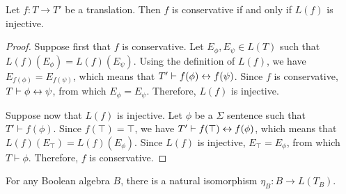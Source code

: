\begin{prop} Let $f:T\to T'$ be a translation. Then $f$ is
  conservative if and only if $L(f)$ is injective. \end{prop}

\begin{proof} Suppose first that $f$ is conservative.  Let $E_\phi
  ,E_\psi\in L(T)$ such that $L(f)(E_\phi )=L(f)(E_\psi )$.  Using the
  definition of $L(f)$, we have $E_{f(\phi )}=E_{f(\psi )}$, which
  means that $T'\vdash f(\phi )\leftrightarrow f(\psi )$.  Since $f$ is
  conservative, $T\vdash \phi\leftrightarrow \psi$, from which $E_\phi=E_\psi$.
  Therefore, $L(f)$ is injective.

  Suppose now that $L(f)$ is injective.  Let $\phi$ be a $\Sigma$
  sentence such that $T'\vdash f(\phi )$.  Since $f(\top )=\top$, we
  have $T'\vdash f(\top )\leftrightarrow f(\phi )$, which means that
  $L(f)(E_{\top})=L(f)(E_\phi )$.  Since $L(f)$ is injective,
  $E_\top=E_\phi$, from which $T\vdash \phi$.  Therefore, $f$ is
  conservative. \end{proof}


\begin{prop} For any Boolean algebra $B$, there is a natural
  isomorphism $\eta _B:B\to L(T_B)$.  \end{prop}

